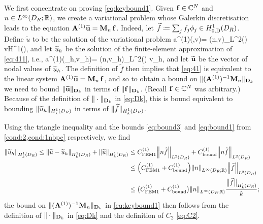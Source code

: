 \

We first concentrate on proving \cref{eq:keybound1}.
Given $\mathbf{f} \in \mathbb C^N$ and $n\in \LiDRRR$, we create a variational problem whose Galerkin discretisation leads to the equation $\mathbf{A}^{(1)} \widetilde{\mathbf{u}} = \mathbf{M}_n\,\mathbf{f}$.
Indeed, let $\widetilde{f} \de \sum_j f_j \phi_j\in \HozDDR$. Define $\widetilde{u}$ to be the solution of the variational problem 
\beq\label{eq:411}
a^{(1)}(,v)= (n,v)_{L^2(\Omega)} \quad{} v\in H^1(\Omega),
\eeq
and let $\widetilde{u}_h$ be the solution of the finite-element approximation of \cref{eq:411}, i.e.,
\beq\label{eq:41}
a^{(1)}(\tu_h,v_h)= (n,v_h)_{L^2(\Omega)} \quad{} v_h\in \Vhp,
\eeq
and let $\widetilde{\mathbf{u}}$ be the vector of nodal values of $\widetilde{u}_h$. The definition of $\widetilde{f}$ then implies that \cref{eq:41} is equivalent to the linear system $\mathbf{A}^{(1)} \widetilde{\mathbf{u}} = \mathbf{M}_{n}\,\mathbf{f}$, and so to obtain a bound on $\|(\mathbf{A}^{(1)})^{-1}\mathbf{M}_n\|_{\mathbf{D}_k}$ we need to bound $\|\widetilde{\mathbf{u}}\|_{\mathbf{D}_k}$ in terms of $\|\mathbf{f}\|_{\mathbf{D}_k}$. (Recall $\mathbf{f} \in \mathbb C^{N}$ was arbitrary.) Because of the definition 
of $\|\cdot\|_{\mathbf{D}_k}$ in \cref{eq:Dk}, this is bound equivalent to bounding $\|\tu_h\|_{\HokDR}$ in terms of $\|\widetilde{f}\|_{\HokDR}$.


Using %
the triangle inequality and the bounds \cref{eq:bound3} and \cref{eq:bound1} from \cref{cond:2,cond:1nbpc} respectively, we find
\begin{align}
\N{\tu_h}_{\HokDR} \leq
\N{\tu-\tu_h}_{\HokDR} + \N{\tu}_{\HokDR} \label{eq:mainevent1}
& \leq C^{(1)}_{\rm FEM1}\NLtDR{n\ftilde} + C^{(1)}_{\rm bound}\NLtDR{n\ftilde} \\ 
& \leq \mleft(C^{(1)}_{\rm FEM1} + C^{(1)}_{\rm bound}\mright)\NLiDRRR{n}\NLtDR{\ftilde} \label{eq:mainevent1a} \\
& \leq\big(C^{(1)}_{\rm FEM1}+  C^{(1)}_{\rm bound}\big)\NLiDRRR{n}\frac{\big\|\widetilde{f}\big\|_{\HokDR}}{k};\nonumber
\end{align}
the bound on $\|(\mathbf{A}^{(1)})^{-1}\mathbf{M}_n\|_{\mathbf{D}_k}$ in \cref{eq:keybound1} then follows from the definition of $\|\cdot\|_{\mathbf{D}_k}$ in \cref{eq:Dk} and the definition of $C_2$ \cref{eq:C2}.

